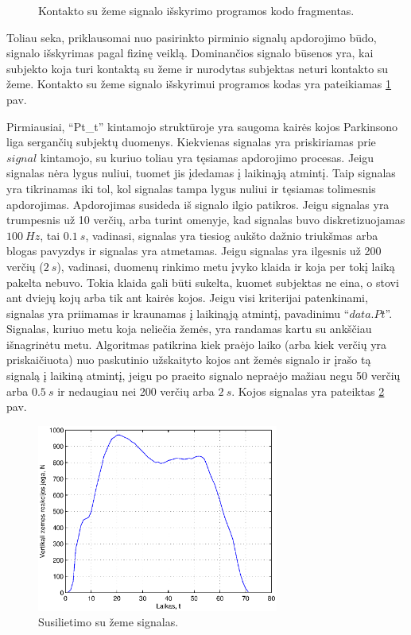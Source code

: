 \documentclass[]{vgtuef}
\begin{document}
\begin{figure}[t]
  \centering
  
  \caption{Kontakto su žeme signalo išskyrimo programos kodo fragmentas.}
  \label{code:signal_extraction}
\end{figure}

Toliau seka, priklausomai nuo pasirinkto pirminio signalų apdorojimo
būdo, signalo išskyrimas pagal fizinę veiklą. Dominančios signalo
būsenos yra, kai subjekto koja turi kontaktą su žeme ir nurodytas
subjektas neturi kontakto su žeme. Kontakto su žeme signalo išskyrimui
programos kodas yra pateikiamas \ref{code:signal_extraction} pav.

Pirmiausiai, ``Pt\_t'' kintamojo struktūroje yra saugoma kairės kojos
Parkinsono liga sergančių subjektų duomenys. Kiekvienas signalas yra
priskiriamas prie $signal$ kintamojo, su kuriuo toliau yra tęsiamas
apdorojimo procesas. Jeigu signalas nėra lygus nuliui, tuomet jis
įdedamas į laikinąją atmintį. Taip signalas yra tikrinamas iki tol,
kol signalas tampa lygus nuliui ir tęsiamas tolimesnis
apdorojimas. Apdorojimas susideda iš signalo ilgio patikros. Jeigu
signalas yra trumpesnis už 10 verčių, arba turint omenyje, kad
signalas buvo diskretizuojamas $100~Hz$, tai $0.1~s$, vadinasi,
signalas yra tiesiog aukšto dažnio triukšmas arba blogas pavyzdys ir
signalas yra atmetamas. Jeigu signalas yra ilgesnis už 200 verčių
($2~s$), vadinasi, duomenų rinkimo metu įvyko klaida ir koja per tokį
laiką pakelta nebuvo. Tokia klaida gali būti sukelta, kuomet subjektas
ne eina, o stovi ant dviejų kojų arba tik ant kairės kojos. Jeigu visi
kriterijai patenkinami, signalas yra priimamas ir kraunamas į
laikinąją atmintį, pavadinimu ``$data.Pt$''. Signalas, kuriuo metu koja
neliečia žemės, yra randamas kartu su ankščiau išnagrinėtu
metu. Algoritmas patikrina kiek praėjo laiko (arba kiek verčių yra
priskaičiuota) nuo paskutinio užskaityto kojos ant žemės signalo ir
įrašo tą signalą į laikiną atmintį, jeigu po praeito signalo nepraėjo
mažiau negu 50 verčių arba $0.5~s$ ir nedaugiau nei 200 verčių arba
$2~s$. Kojos signalas yra pateiktas \ref{fig:stance_phase} pav.

\begin{figure}[t]
  \centering
  \includegraphics[width=300px]{figures/09_sample_stance_phase.eps}
  \caption{Susilietimo su žeme signalas.}
  \label{fig:stance_phase}
\end{figure}
\end{document}
